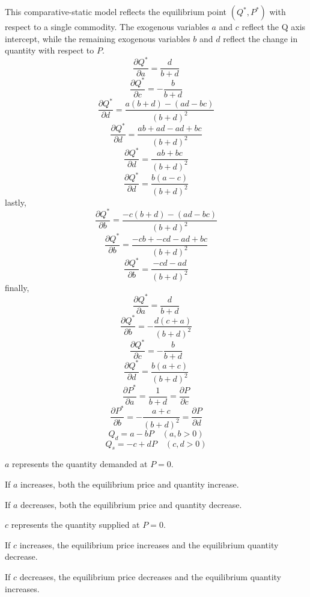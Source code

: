 \documentclass[12pt]{article}
\newcounter{ques}
\newenvironment{question}{\stepcounter{ques}{\noindent\bf Question \arabic{ques}:}}{\vspace{5mm}}
\begin{document}
\begin{question}
\begin{enumerate}[label=(\alph*)]
            This comparative-static model reflects the equilibrium point $(Q^*, P^*)$ with respect to a single commodity. 
            The exogenous variables $a$ and $c$ reflect the Q axis intercept, while the remaining exogenous variables $b$ and $d$ 
            reflect the change in quantity with respect to $P$.
            $$ \frac{\partial Q^*}{\partial a} = \frac{d}{b+d} 
            $$
            $$ \frac{\partial Q^*}{\partial c} = -\frac{b}{b+d} 
            $$
            $$ \frac{\partial Q^*}{\partial d} = \frac{a(b+d) - (ad -bc)}{(b+d)^2} 
            $$
            $$ \frac{\partial Q^*}{\partial d} = \frac{ab+ad - ad +bc}{(b+d)^2} 
            $$
            $$ \frac{\partial Q^*}{\partial d} = \frac{ab +bc}{(b+d)^2} 
            $$
            $$ \frac{\partial Q^*}{\partial d} = \frac{b(a-c)}{(b+d)^2} 
            $$
            lastly,
            $$ \frac{\partial Q^*}{\partial b} = \frac{-c(b+d) - (ad -bc)}{(b+d)^2} 
            $$
            $$ \frac{\partial Q^*}{\partial b} = \frac{-cb+-cd - ad +bc}{(b+d)^2} 
            $$
            $$ \frac{\partial Q^*}{\partial b} = \frac{-cd - ad }{(b+d)^2} 
            $$
            finally,
            $$ \frac{\partial Q^*}{\partial a} = \frac{d}{b+d}
            $$
            $$ \frac{\partial Q^*}{\partial b} = -\frac{d(c + a) }{(b+d)^2} 
            $$
            $$ \frac{\partial Q^*}{\partial c} = -\frac{b}{b+d}
            $$
            $$ \frac{\partial Q^*}{\partial d} = \frac{b(a+c)}{(b+d)^2} 
            $$
            $$ \frac{\partial P^*}{\partial a} = \frac{1}{b+d} = \frac{\partial P}{\partial c}
            $$
            $$ \frac{\partial P^*}{\partial b} = -\frac{a + c}{(b+d)^2} = \frac{\partial P}{\partial d}
            $$
            $$Q_d = a-bP \quad (a, b> 0)$$
            $$Q_s = -c +dP \quad (c, d > 0)$$

            $a$ represents the quantity demanded at $P = 0$.

            If $a$ increases, both the equilibrium price and quantity increase.

            If $a$ decreases, both the equilibrium price and quantity decrease.

            $c$ represents the quantity supplied at $P = 0$.

            If $c$ increases, the equilibrium price increases and the equilibrium quantity decrease.

            If $c$ decreases, the equilibrium price decreases and the equilibrium quantity increases.


\end{enumerate}
\end{question}
\end{document}
